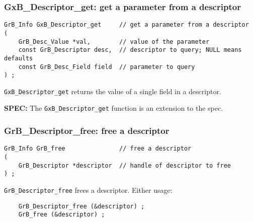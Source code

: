 \documentclass[12pt]{article}
\begin{document}
\subsubsection{{\sf GxB\_Descriptor\_get:}  get a parameter from a descriptor}
\label{descriptor_get}

\begin{mdframed}[userdefinedwidth=6in]
{\footnotesize
\begin{verbatim}
GrB_Info GxB_Descriptor_get     // get a parameter from a descriptor
(
    GrB_Desc_Value *val,        // value of the parameter
    const GrB_Descriptor desc,  // descriptor to query; NULL means defaults
    const GrB_Desc_Field field  // parameter to query
) ;
\end{verbatim} } \end{mdframed}

\verb'GxB_Descriptor_get' returns the value of a single field in a descriptor.

\begin{spec}
{\bf SPEC:} The \verb'GxB_Descriptor_get' function is an extension to the spec.
\end{spec}

\subsubsection{{\sf GrB\_Descriptor\_free:} free a descriptor}
\label{descriptor_free}

\begin{mdframed}[userdefinedwidth=6in]
{\footnotesize
\begin{verbatim}
GrB_Info GrB_free               // free a descriptor
(
    GrB_Descriptor *descriptor  // handle of descriptor to free
) ;
\end{verbatim} } \end{mdframed}

\verb'GrB_Descriptor_free' frees a descriptor.
Either usage:

    {\small
    \begin{verbatim}
    GrB_Descriptor_free (&descriptor) ;
    GrB_free (&descriptor) ; \end{verbatim}}
\end{document}
